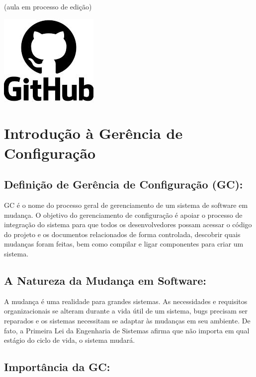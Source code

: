 \documentclass[
]{book}
\begin{document}
(aula em processo de edição)

\includegraphics{images/clipboard-871701020.png}

\section{Introdução à Gerência de Configuração}\label{introduuxe7uxe3o-uxe0-geruxeancia-de-configurauxe7uxe3o}

\subsection{Definição de Gerência de Configuração (GC):}\label{definiuxe7uxe3o-de-geruxeancia-de-configurauxe7uxe3o-gc}

GC é o nome do processo geral de gerenciamento de um sistema de software em mudança. O objetivo do gerenciamento de configuração é apoiar o processo de integração do sistema para que todos os desenvolvedores possam acessar o código do projeto e os documentos relacionados de forma controlada, descobrir quais mudanças foram feitas, bem como compilar e ligar componentes para criar um sistema.

\subsection{A Natureza da Mudança em Software:}\label{a-natureza-da-mudanuxe7a-em-software}

A mudança é uma realidade para grandes sistemas. As necessidades e requisitos organizacionais se alteram durante a vida útil de um sistema, bugs precisam ser reparados e os sistemas necessitam se adaptar às mudanças em seu ambiente. De fato, a Primeira Lei da Engenharia de Sistemas afirma que não importa em qual estágio do ciclo de vida, o sistema mudará.

\subsection{Importância da GC:}\label{importuxe2ncia-da-gc}
\end{document}
